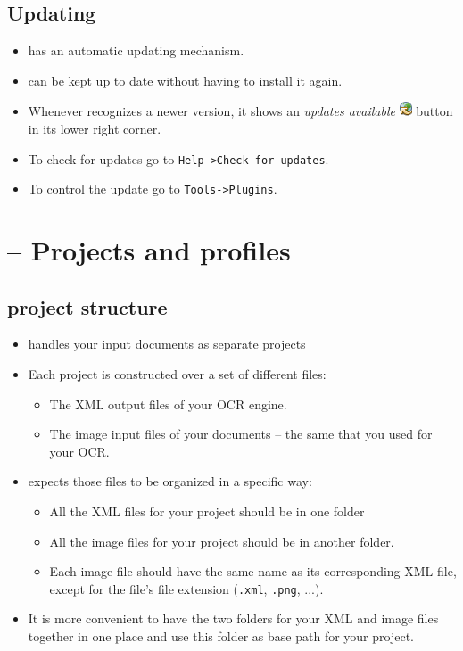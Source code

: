\subsection{Updating}
\begin{frame}
	\begin{itemize}
		\item \pocoto{} has an automatic updating mechanism.
		\item \pocoto{} can be kept up to date without having to install it again.
		\item Whenever \pocoto recognizes a newer version, it shows an \emph{updates
			available} \includegraphics{../presentations/images/update-baloon.png}
			button in its lower right corner.
		\item To check for updates go to \texttt{Help->Check for updates}.
		\item To control the update go to \texttt{Tools->Plugins}.
	\end{itemize}
\end{frame}

\section{\pocoto{} -- Projects and profiles}
\subsection{\pocoto{} project structure}
\begin{frame}
	\begin{itemize}
		\item \pocoto{} handles your input documents as separate projects
		\item Each project is constructed over a set of different files:
			\begin{itemize}
				\item The XML output files of your OCR engine.
				\item The image input files of your documents -- the same that you
					used for your OCR.
			\end{itemize}
		\item \pocoto{} expects those files to be organized in a specific way:
			\begin{itemize}
				\item All the XML files for your project should be in one folder
				\item All the image files for your project should be in another
					folder.
				\item Each image file should have the same name as its corresponding
					XML
					file, except for the file's file extension (\texttt{.xml},
					\texttt{.png}, ...).
			\end{itemize}
		\item It is more convenient to have the two folders for your XML and image
			files together in one place and use this folder as base path for
			your project.
	\end{itemize}
\end{frame}


